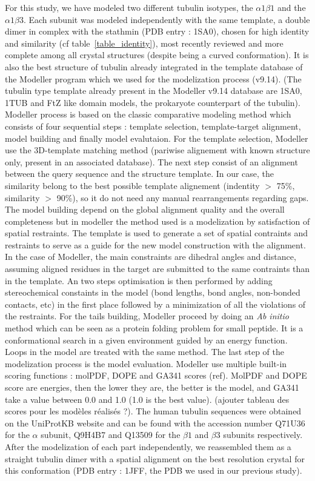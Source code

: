 \documentclass[a4paper]{article}
\begin{document}
For this study, we have modeled two different tubulin isotypes, the $\alpha1\beta1$ and the $\alpha1\beta3$. Each
subunit was modeled independently with the same template, a double dimer in complex with the stathmin
(PDB entry : 1SA0), chosen for high identity and similarity (cf table~\ref{table_identity}), most recently reviewed
and more complete
among all crystal structures (despite being a curved conformation). It is also the best structure of tubulin
already integrated in the template database of the Modeller program which we used for the modelization process (v9.14).
(The tubulin type template already present in the Modeller v9.14 database are 1SA0, 1TUB and FtZ like domain models, the
prokaryote counterpart of the tubulin).
Modeller process is based on the classic comparative modeling method which consists of four
sequential steps : template selection, template-target alignment, model building and finally
model evalutaion. For the template selection, Modeller use the 3D-template matching method
(pariwise alignement with known structure only, present in an associated database). The next
step consist of an alignment between the query sequence and the structure template. In our
case, the similarity belong to the best possible template alignement (indentity $>$ 75\%, similarity $>$ 90\%),
so it do not need any manual
rearrangements regarding gaps. The model building depend on the global alignment quality and the overall
completeness but in modeller the method used is a modelization by satisfaction of spatial restraints.
The template is used to generate a set of spatial contraints and restraints to serve as a guide for
the new model construction with the alignment. In the case of Modeller, the main constraints are
dihedral angles and distance, assuming aligned residues in the target are submitted to the same contraints
than in the template. An two steps optimisation is then performed by adding stereochemical constaints in the
model (bond lengths, bond angles, non-bonded contacts, etc) in the first place followed by a minimization
of all the violations of the restraints. For the tails building, Modeller proceed by doing an \textit{Ab initio}
method which can be seen as a protein folding problem for small peptide. It is a conformational search
in a given environment guided by an energy function. Loops in the model are treated with the same method.
The last step of the modelization process is the model evaluation. Modeller use multiple built-in scoring
functions : molPDF, DOPE and GA341 scores (ref). MolPDF and DOPE score are energies, then the lower they are, the better
is the model, and GA341 take a value between 0.0 and 1.0 (1.0 is the best value). (ajouter tableau des scores
pour les modèles réalisés ?). The human tubulin sequences were obtained on the UniProtKB
website and can be found with the accession number Q71U36 for the $\alpha$ subunit, Q9H4B7 and Q13509
for the $\beta1$ and $\beta3$ subunits respectively. After the modelization of each part independently, we reassembled them
as a straight tubulin dimer with a spatial alignment on the best resolution crystal for this conformation
(PDB entry : 1JFF, the PDB we used in our previous study).
\end{document}
